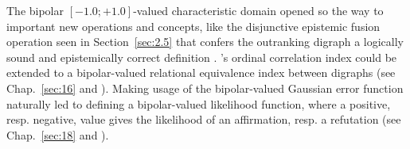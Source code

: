 The bipolar $[-1.0;+1.0]$-valued characteristic domain opened so the way to important new operations and concepts, like the disjunctive epistemic fusion operation seen in Section~\vref{sec:2.5} that confers the outranking digraph a logically sound and epistemically correct definition \citep{BIS-2013}. \Kendall 's ordinal correlation index could be extended to a bipolar-valued relational equivalence index between digraphs (see Chap.~\ref{sec:16} and \citealp{BIS-2012a}). Making usage of the bipolar-valued Gaussian error function naturally led to defining a bipolar-valued likelihood function, where a positive, resp. negative, value gives the likelihood of an affirmation, resp. a refutation (see Chap.~\ref{sec:18} and \citealp{BIS-2014}).      

%


